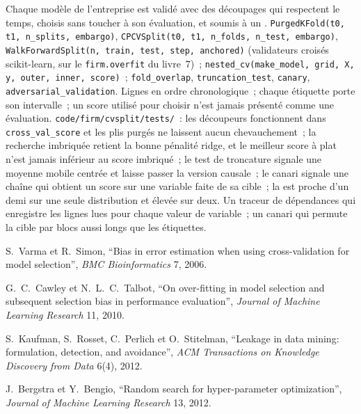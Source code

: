 \begin{build}
 Chaque modèle de l'entreprise est validé avec des découpages qui respectent le temps, choisis sans toucher à son
évaluation, et soumis à un .
 \texttt{PurgedKFold(t0, t1, n\_splits, embargo)},
\texttt{CPCVSplit(t0, t1, n\_folds, n\_test, embargo)}, \texttt{WalkForwardSplit(n, train, test, step, anchored)} (validateurs croisés scikit-learn, sur le
\texttt{firm.overfit} du livre~7)~; \texttt{nested\_cv(make\_model, grid, X, y, outer, inner, score)}~;
\texttt{fold\_overlap}, \texttt{truncation\_test}, \texttt{canary}, \texttt{adversarial\_validation}.
 Lignes en ordre chronologique~; chaque étiquette porte son intervalle~; un score utilisé pour choisir n'est jamais présenté comme une
évaluation.
 \texttt{code/firm/cvsplit/tests/}~: les découpeurs fonctionnent dans \texttt{cross\_val\_score} et
les plis purgés ne laissent aucun chevauchement~; la recherche imbriquée retient la bonne pénalité ridge, et le meilleur score à plat n'est jamais inférieur au
score imbriqué~; le test de troncature signale une moyenne mobile centrée et laisse passer la version causale~; le canari signale une chaîne qui
obtient un score sur une variable faite de sa cible~; la  est proche d'un demi sur une seule distribution et élevée sur deux.
 Un traceur de dépendances qui enregistre les lignes lues pour chaque valeur de variable~; un canari qui permute la cible
par blocs aussi longs que les étiquettes.
\end{build}

\begin{omsources}
\item S.~Varma et R.~Simon, ``Bias in error estimation when using cross-validation for model selection'', \emph{BMC
Bioinformatics} 7, 2006.
\item G.~C.~Cawley et N.~L.~C.~Talbot, ``On over-fitting in model selection and subsequent selection bias in performance
evaluation'', \emph{Journal of Machine Learning Research} 11, 2010.
\item S.~Kaufman, S.~Rosset, C.~Perlich et O.~Stitelman, ``Leakage in data mining: formulation, detection, and
avoidance'', \emph{ACM Transactions on Knowledge Discovery from Data} 6(4), 2012.
\item J.~Bergstra et Y.~Bengio, ``Random search for hyper-parameter optimization'', \emph{Journal of Machine Learning
Research} 13, 2012.
\end{omsources}

